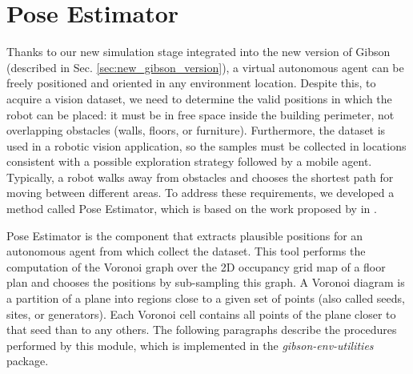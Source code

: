 \section{Pose Estimator}
\label{sec:pose_estimator}
Thanks to our new simulation stage integrated into the new version of Gibson (described in Sec. \ref{sec:new_gibson_version}), a virtual autonomous agent can be freely positioned and oriented in any environment location. Despite this, to acquire a vision dataset, we need to determine the valid positions in which the robot can be placed: it must be in free space inside the building perimeter, not overlapping obstacles (walls, floors, or furniture). Furthermore, the dataset is used in a robotic vision application, so the samples must be collected in locations consistent with a possible exploration strategy followed by a mobile agent. Typically, a robot walks away from obstacles and chooses the shortest path for moving between different areas. To address these requirements, we developed a method called Pose Estimator, which is based on the work proposed by \citeauthor{repeatabilityslamarxiv} in \cite{repeatabilityslamarxiv, repeatabilityslam}.

Pose Estimator is the component that extracts plausible positions for an autonomous agent from which collect the dataset. This tool performs the computation of the Voronoi graph over the 2D occupancy grid map \cite{cuupancygridfirst} of a floor plan and chooses the positions by sub-sampling this graph. A Voronoi diagram is a partition of a plane into regions close to a given set of points (also called seeds, sites, or generators). Each Voronoi cell contains all points of the plane closer to that seed than to any others. The following paragraphs describe the procedures performed by this module, which is implemented in the \textit{gibson-env-utilities} package.



